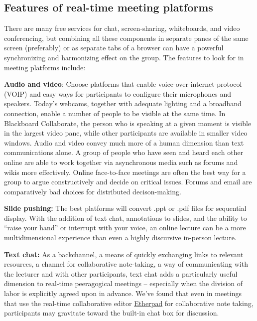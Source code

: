 \subsection{Features of real-time meeting
platforms}\label{features-of-real-time-meeting-platforms}

There are many free services for chat, screen-sharing, whiteboards, and
video conferencing, but combining all these components in separate panes
of the same screen (preferably) or as separate tabs of a browser can
have a powerful synchronizing and harmonizing effect on the group. The
features to look for in meeting platforms include:

\textbf{Audio and video}: Choose platforms that enable
voice-over-internet-protocol (VOIP) and easy ways for participants to
configure their microphones and speakers. Today's webcams, together with
adequate lighting and a broadband connection, enable a number of people
to be visible at the same time. In Blackboard Collaborate, the person
who is speaking at a given moment is visible in the largest video pane,
while other participants are available in smaller video windows. Audio
and video convey much more of a human dimension than text communications
alone. A group of people who have seen and heard each other online are
able to work together via asynchronous media such as forums and wikis
more effectively. Online face-to-face meetings are often the best way
for a group to argue constructively and decide on critical issues.
Forums and email are comparatively bad choices for distributed
decison-making.

\textbf{Slide pushing:} The best platforms will convert .ppt or .pdf
files for sequential display. With the addition of text chat,
annotations to slides, and the ability to ``raise your hand'' or
interrupt with your voice, an online lecture can be a more
multidimensional experience than even a highly discursive in-person
lecture.

\textbf{Text chat:} As a backchannel, a means of quickly exchanging
links to relevant resources, a channel for collaborative note-taking, a
way of communicating with the lecturer and with other participants, text
chat adds a particularly useful dimension to real-time peeragogical
meetings -- especially when the division of labor is explicitly agreed
upon in advance. We've found that even in meetings that use the
real-time collaborative editor \href{http://etherpad.org}{Etherpad} for
collaborative note taking, participants may gravitate toward the
built-in chat box for discussion.


